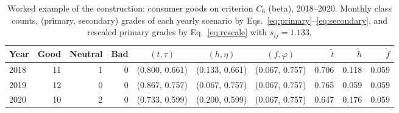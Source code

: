 \begin{table}[!htbp]
\centering
\scriptsize
\caption{Worked example of the construction: consumer goods on criterion $C_6$ (beta), 2018--2020. Monthly class counts, (primary, secondary) grades of each yearly scenario by Eqs.~\eqref{eq:primary}--\eqref{eq:secondary}, and rescaled primary grades by Eq.~\eqref{eq:rescale} with $s_{ij}=1.133$.}\label{tab:example}
\begin{adjustbox}{max width=\textwidth}
\begin{tabular}{lrrrcccrrr}
\toprule
Year & Good & Neutral & Bad & $(t,\tau)$ & $(h,\eta)$ & $(f,\varphi)$ & $\tilde t$ & $\tilde h$ & $\tilde f$ \\
\midrule
2018 & 11 & 1 & 0 & (0.800, 0.661) & (0.133, 0.661) & (0.067, 0.757) & 0.706 & 0.118 & 0.059 \\
2019 & 12 & 0 & 0 & (0.867, 0.757) & (0.067, 0.757) & (0.067, 0.757) & 0.765 & 0.059 & 0.059 \\
2020 & 10 & 2 & 0 & (0.733, 0.599) & (0.200, 0.599) & (0.067, 0.757) & 0.647 & 0.176 & 0.059 \\
\bottomrule
\end{tabular}
\end{adjustbox}
\end{table}
